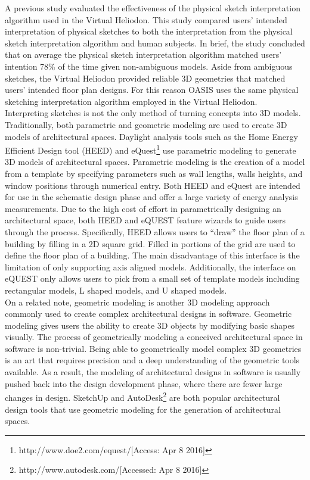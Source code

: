 	A previous study evaluated the effectiveness of the physical sketch interpretation algorithm used in the Virtual Heliodon\cite{cutler2009inferring}.
	This study compared users' intended interpretation of physical sketches to both the
	interpretation from the physical sketch interpretation algorithm and human subjects.
	In brief, the study concluded that on average the physical sketch interpretation algorithm matched users' intention 78\% of the time given non-ambiguous models\cite{cutler2009inferring}.
	Aside from ambiguous sketches, the Virtual Heliodon provided reliable 3D geometries that matched users' intended floor plan designs.
	For this reason OASIS uses the same physical sketching interpretation algorithm employed in the Virtual Heliodon.\\

	Interpreting sketches is not the only method of turning concepts into 3D models.
	Traditionally, both parametric and geometric modeling are used to create 3D models of architectural spaces.
	Daylight analysis tools such as the Home Energy Efficient Design tool (HEED) and eQuest\footnote{http://www.doe2.com/equest/[Access: Apr 8 2016]} use parametric modeling to generate 3D models of architectural spaces\cite{milne2001drag}.
	Parametric modeling is the creation of a model from a template by specifying parameters such as wall lengths, walls heights, and window positions through numerical entry.
	Both HEED and eQuest are intended for use in the schematic design phase and offer a large variety of energy analysis measurements.
	Due to the high cost of effort in parametrically designing an architectural space, both HEED and eQUEST feature wizards to guide users through the process. 
	Specifically, HEED allows users to ``draw'' the floor plan of a building by filling in a 2D square grid. Filled in portions of the grid are used to define the floor plan of a building. The main disadvantage of this interface is the limitation of only supporting axis aligned models. 
	Additionally, the interface on eQUEST only allows users to pick from a small set of template models including rectangular models, L shaped models, and U shaped models.\\

	On a related note, geometric modeling is another 3D modeling approach commonly used to create complex architectural designs in software.
	Geometric modeling gives users the ability to create 3D objects by modifying basic shapes visually.
	The process of geometrically modeling a conceived architectural space in software is non-trivial.
	Being able to geometrically model complex 3D geometries is an art that requires precision and a deep understanding of the geometric tools available.
	As a result, the modeling of architectural designs in software is usually pushed back into the design development phase, where there are fewer large changes in design\cite{Galasiu}.
	SketchUp and AutoDesk\footnote{http://www.autodesk.com/[Accessed: Apr 8 2016]} are both popular architectural design tools that use geometric modeling for the generation of architectural spaces. \\

